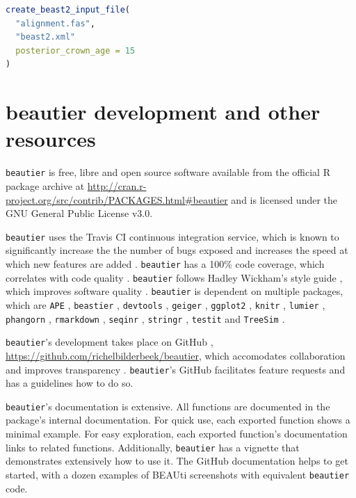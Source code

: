 \documentclass{article}
\begin{document}
\begin{lstlisting}[language=R, caption=Example with fixed crown age, label=lst:fixed_crown_age, floatplacement=H]
create_beast2_input_file(
  "alignment.fas",
  "beast2.xml"
  posterior_crown_age = 15
)
\end{lstlisting}

\section{beautier development and other resources}

\verb;beautier; is free, libre and open source software available from the official R package archive at 
\url{http://cran.r-project.org/src/contrib/PACKAGES.html\#beautier}
and is licensed under the GNU General Public License v3.0.

\verb;beautier; uses the Travis CI \cite{travis} 
continuous integration service, which is known to significantly 
increase the the number of bugs exposed \cite{vasilescu2015} and increases
the speed at which new features are added \cite{vasilescu2015}.
\verb;beautier; has a 100\% code coverage, which correlates with code quality \cite{horgan1994,del1995correlation}. 
\verb;beautier; follows Hadley Wickham's style guide \cite{style_guide}, which improves software quality \cite{fang2001}.
\verb;beautier; is dependent on multiple packages, which are 
\verb;APE; \cite{APE}, 
\verb;beastier; \cite{beastier},
\verb;devtools; \cite{devtools},
\verb;geiger; \cite{GEIGER},
\verb;ggplot2; \cite{ggplot2},
\verb;knitr; \cite{knitr},
\verb;lumier; \cite{lumier},
\verb;phangorn; \cite{phangorn},
\verb;rmarkdown; \cite{rmarkdown},
\verb;seqinr; \cite{seqinr},
\verb;stringr; \cite{stringr},
\verb;testit; \cite{testit} and 
\verb;TreeSim; \cite{TreeSim}.

\verb;beautier;'s development takes place on GitHub \cite{github},
\url{https://github.com/richelbilderbeek/beautier}, 
which accomodates collaboration \cite{perez2016ten} 
and improves transparency \cite{gorgolewski2016practical}.
\verb;beautier;'s GitHub facilitates feature requests and has a guidelines how to do so.

\verb;beautier;'s documentation is extensive. All functions are documented
in the package's internal documentation. For quick use, each exported function shows a minimal example. 
For easy exploration, each exported function's documentation links to related functions.
Additionally, \verb;beautier; has a vignette that demonstrates extensively how
to use it. The GitHub documentation helps to get started, with a dozen examples 
of BEAUti screenshots with equivalent \verb;beautier; code.
\end{document}
